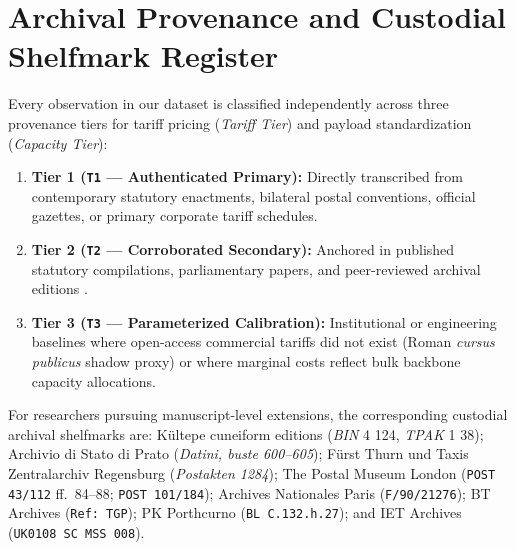 \documentclass[11pt,a4paper]{article}
\begin{document}
\appendix

\section{Archival Provenance and Custodial Shelfmark Register}
\label{app:archival_ledger}

Every observation in our dataset is classified independently across three provenance tiers for tariff pricing (\textit{Tariff Tier}) and payload standardization (\textit{Capacity Tier}):
\begin{enumerate}
    \item \textbf{Tier 1 (\texttt{T1} --- Authenticated Primary):} Directly transcribed from contemporary statutory enactments, bilateral postal conventions, official gazettes, or primary corporate tariff schedules.
    \item \textbf{Tier 2 (\texttt{T2} --- Corroborated Secondary):} Anchored in published statutory compilations, parliamentary papers, and peer-reviewed archival editions \citep{Dallmeier1977,Frangioni1994,Scholliers1995}.
    \item \textbf{Tier 3 (\texttt{T3} --- Parameterized Calibration):} Institutional or engineering baselines where open-access commercial tariffs did not exist (Roman \textit{cursus publicus} shadow proxy) or where marginal costs reflect bulk backbone capacity allocations.
\end{enumerate}

For researchers pursuing manuscript-level extensions, the corresponding custodial archival shelfmarks are: K\"ultepe cuneiform editions (\textit{BIN} 4 124, \textit{TPAK} 1 38); Archivio di Stato di Prato (\textit{Datini, buste 600--605}); F\"urst Thurn und Taxis Zentralarchiv Regensburg (\textit{Postakten 1284}); The Postal Museum London (\texttt{POST 43/112} ff.\ 84--88; \texttt{POST 101/184}); Archives Nationales Paris (\texttt{F/90/21276}); BT Archives (\texttt{Ref:\ TGP}); PK Porthcurno (\texttt{BL C.132.h.27}); and IET Archives (\texttt{UK0108 SC MSS 008}).
\end{document}

